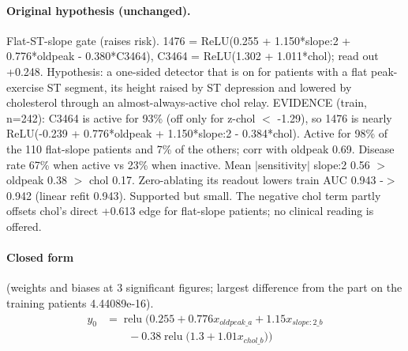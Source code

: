 \documentclass[a4paper,10pt]{article}
\newif\ifreviewmarks
\newcommand{\reviewrule}{\noindent{\color{BrickRed}\rule{\linewidth}{0.8pt}}}
\newenvironment{drafted}[1][]{%
  \ifreviewmarks\par\addvspace{\medskipamount}\reviewrule\par\nopagebreak
  \noindent{\color{BrickRed}\sffamily\footnotesize\textbf{Thesis Draft}\quad #1\hfill review}\par\nopagebreak\smallskip\fi}{%
  \ifreviewmarks\par\smallskip\noindent{\color{BrickRed}\sffamily\footnotesize end of thesis draft}\par\nopagebreak\reviewrule\par\medskip\fi}
\begin{document}
\begin{drafted}[plain-language layer: heart-s2-c1]
\paragraph{Original hypothesis (unchanged).} Flat-ST-slope gate (raises risk). 1476 = ReLU(0.255 + 1.150*slope:2 + 0.776*oldpeak - 0.380*C3464), C3464 = ReLU(1.302 + 1.011*chol); read out +0.248. Hypothesis: a one-sided detector that is on for patients with a flat peak-exercise ST segment, its height raised by ST depression and lowered by cholesterol through an almost-always-active chol relay. EVIDENCE (train, n=242): C3464 is active for 93\% (off only for z-chol $<$ -1.29), so 1476 is nearly ReLU(-0.239 + 0.776*oldpeak + 1.150*slope:2 - 0.384*chol). Active for 98\% of the 110 flat-slope patients and 7\% of the others; corr with oldpeak 0.69. Disease rate 67\% when active vs 23\% when inactive. Mean $|$sensitivity$|$ slope:2 0.56 $>$ oldpeak 0.38 $>$ chol 0.17. Zero-ablating its readout lowers train AUC 0.943 -$>$ 0.942 (linear refit 0.943). Supported but small. The negative chol term partly offsets chol's direct +0.613 edge for flat-slope patients; no clinical reading is offered.
\paragraph{Closed form} {\footnotesize(weights and biases at 3 significant figures; largest difference from the part on the training patients 4.44089e-16).}
{\small\begingroup\allowdisplaybreaks
\begin{align*}
y_{0} &= \operatorname{relu}\bigl(0.255 + 0.776 x_{oldpeak\_a} + 1.15 x_{slope:2\_b} \\
&\qquad - 0.38 \operatorname{relu}\bigl(1.3 + 1.01 x_{chol\_b}\bigr)\bigr)
\end{align*}\endgroup}


\end{drafted}
\end{document}
